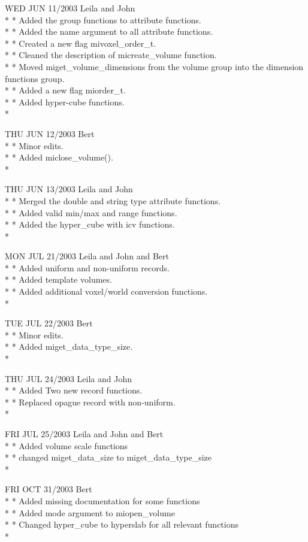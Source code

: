 \documentclass{article}
\begin{document}
WED  JUN 11/2003 Leila and John\\* 
* Added the group functions to attribute functions.\\*
* Added the name argument to all attribute functions.\\* 
* Created a new flag mivoxel\_order\_t.\\* 
* Cleaned the description of micreate\_volume function.\\*
* Moved miget\_volume\_dimensions from the volume group into the dimension functions group.\\*
* Added a new flag miorder\_t.\\*
* Added hyper-cube functions.\\*

THU  JUN 12/2003 Bert\\*
* Minor edits.\\*
* Added miclose\_volume().\\*

THU  JUN 13/2003 Leila and John\\*
* Merged the double and string type attribute functions.\\*
* Added valid min/max and range functions.\\*
* Added the hyper\_cube with icv functions.\\*

MON  JUL 21/2003 Leila and John and Bert\\*
* Added uniform and non-uniform records.\\*
* Added template volumes.\\*
* Added additional voxel/world conversion functions.\\*

TUE  JUL 22/2003 Bert\\*
* Minor edits.\\*
* Added miget\_data\_type\_size.\\*

THU  JUL 24/2003 Leila and John\\*
* Added Two new record functions.\\*
* Replaced opague record with non-uniform.\\*

FRI  JUL 25/2003 Leila and John and Bert\\*
* Added volume scale functions\\*
* changed miget\_data\_size to miget\_data\_type\_size\\*

FRI  OCT 31/2003 Bert\\*
* Added missing documentation for some functions\\*
* Added mode argument to miopen\_volume\\*
* Changed hyper\_cube to hyperslab for all relevant functions\\*
\end{document}
